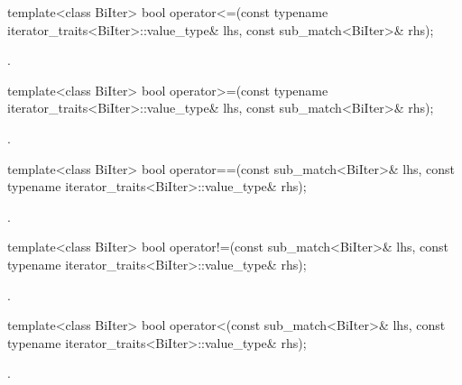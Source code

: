 %
\begin{itemdecl}
template<class BiIter>
  bool operator<=(const typename iterator_traits<BiIter>::value_type& lhs,
                  const sub_match<BiIter>& rhs);
\end{itemdecl}

\begin{itemdescr}
\pnum
\returns {}.
\end{itemdescr}

%
\begin{itemdecl}
template<class BiIter>
  bool operator>=(const typename iterator_traits<BiIter>::value_type& lhs,
                  const sub_match<BiIter>& rhs);
\end{itemdecl}

\begin{itemdescr}
\pnum
\returns {}.
\end{itemdescr}

%
\begin{itemdecl}
template<class BiIter>
  bool operator==(const sub_match<BiIter>& lhs,
                  const typename iterator_traits<BiIter>::value_type& rhs);
\end{itemdecl}

\begin{itemdescr}
\pnum
\returns {}.
\end{itemdescr}

%
\begin{itemdecl}
template<class BiIter>
  bool operator!=(const sub_match<BiIter>& lhs,
                  const typename iterator_traits<BiIter>::value_type& rhs);
\end{itemdecl}

\begin{itemdescr}
\pnum
\returns {}.
\end{itemdescr}

%
\begin{itemdecl}
template<class BiIter>
  bool operator<(const sub_match<BiIter>& lhs,
                 const typename iterator_traits<BiIter>::value_type& rhs);
\end{itemdecl}

\begin{itemdescr}
\pnum
\returns {}.
\end{itemdescr}

